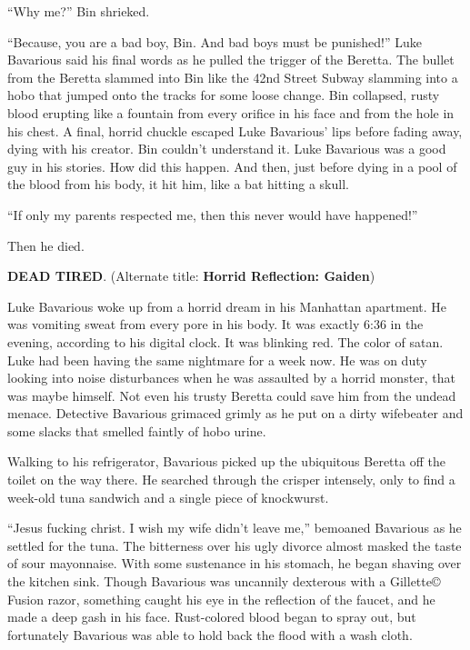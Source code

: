 ``Why me?'' Bin shrieked.

``Because, you are a bad boy, Bin. And bad boys must be
punished!'' Luke Bavarious said his final words as he pulled
the trigger of the Beretta. The bullet from the Beretta slammed
into Bin like the 42nd Street Subway slamming into a hobo that
jumped onto the tracks for some loose change. Bin collapsed, rusty
blood erupting like a fountain from every orifice in his face and
from the hole in his chest. A final, horrid chuckle escaped Luke
Bavarious' lips before fading away, dying with his creator.
Bin couldn't understand it. Luke Bavarious was a good guy in
his stories. How did this happen. And then, just before dying in a
pool of the blood from his body, it hit him, like a bat hitting a
skull.

``If only my parents respected me, then this never would have
happened!''

Then he died. 
 





{\bf DEAD TIRED}. (Alternate title: {\bf Horrid Reflection:
Gaiden})



Luke Bavarious woke up from a horrid dream in his Manhattan
apartment. He was vomiting sweat from every pore in his body. It
was exactly 6:36 in the evening, according to his digital clock. It
was blinking red. The color of satan. Luke had been having the same
nightmare for a week now. He was on duty looking into noise
disturbances when he was assaulted by a horrid monster, that was
maybe himself. Not even his trusty Beretta could save him from the
undead menace. Detective Bavarious grimaced grimly as he put on a
dirty wifebeater and some slacks that smelled faintly of hobo
urine.



Walking to his refrigerator, Bavarious picked up the ubiquitous
Beretta off the toilet on the way there. He searched through the
crisper intensely, only to find a week-old tuna sandwich and a
single piece of knockwurst.



``Jesus fucking christ. I wish my wife didn't leave me,'' bemoaned
Bavarious as he settled for the tuna. The bitterness over his ugly
divorce almost masked the taste of sour mayonnaise. With some
sustenance in his stomach, he began shaving over the kitchen sink.
Though Bavarious was uncannily dexterous with a Gillette{\copyright}
Fusion razor, something caught his eye in the reflection of the
faucet, and he made a deep gash in his face. Rust-colored blood
began to spray out, but fortunately Bavarious was able to hold back
the flood with a wash cloth.



